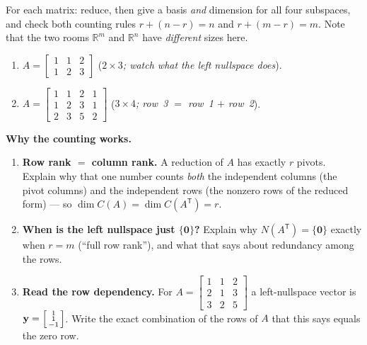\documentclass[10pt]{article}
\newcommand{\yy}{\mathbf{y}}
\newcommand{\zero}{\mathbf{0}}
\newcommand{\T}{\mathsf{T}}
\begin{document}
\begin{tcolorbox}[colback=white, colframe=black!40, title=\textbf{Tier A --- Approaching Proficiency},
    fonttitle=\bfseries, arc=1.5mm, left=3mm, right=3mm, top=2mm, bottom=2mm, breakable]
For each matrix: reduce, then give a basis \emph{and} dimension for all four subspaces, and check both
counting rules $r+(n-r)=n$ and $r+(m-r)=m$. Note that the two rooms $\mathbb{R}^m$ and $\mathbb{R}^n$ have
\emph{different} sizes here.
\begin{enumerate}[leftmargin=1.7em, itemsep=9pt]
  \item $A=\begin{bmatrix} 1 & 1 & 2 \\ 1 & 2 & 3 \end{bmatrix}$ \quad (\emph{$2\times3$; watch what the left nullspace does}). 
  \item $A=\begin{bmatrix} 1 & 1 & 2 & 1 \\ 1 & 2 & 3 & 1 \\ 2 & 3 & 5 & 2 \end{bmatrix}$ \quad (\emph{$3\times4$; row~3 $=$ row~1 $+$ row~2}). 
\end{enumerate}
\end{tcolorbox}

\begin{tcolorbox}[colback=white, colframe=black!40, title=\textbf{Tier E --- Extension},
    fonttitle=\bfseries, arc=1.5mm, left=3mm, right=3mm, top=2mm, bottom=2mm, breakable]
\textbf{Why the counting works.}
\begin{enumerate}[leftmargin=1.7em, itemsep=9pt]
  \item \textbf{Row rank $=$ column rank.} A reduction of $A$ has exactly $r$ pivots. Explain why that one
        number counts \emph{both} the independent columns (the pivot columns) and the independent rows (the
        nonzero rows of the reduced form) --- so $\dim C(A)=\dim C(A^{\T})=r$. 
  \item \textbf{When is the left nullspace just $\{\zero\}$?} Explain why $N(A^{\T})=\{\zero\}$ exactly when
        $r=m$ (``full row rank''), and what that says about redundancy among the rows. 
  \item \textbf{Read the row dependency.} For $A=\begin{bmatrix} 1 & 1 & 2 \\ 2 & 1 & 3 \\ 3 & 2 & 5 \end{bmatrix}$
        a left-nullspace vector is $\yy=\begin{bsmallmatrix} 1\\1\\-1 \end{bsmallmatrix}$. Write the exact
        combination of the rows of $A$ that this says equals the zero row. 
\end{enumerate}
\end{tcolorbox}
\end{document}
